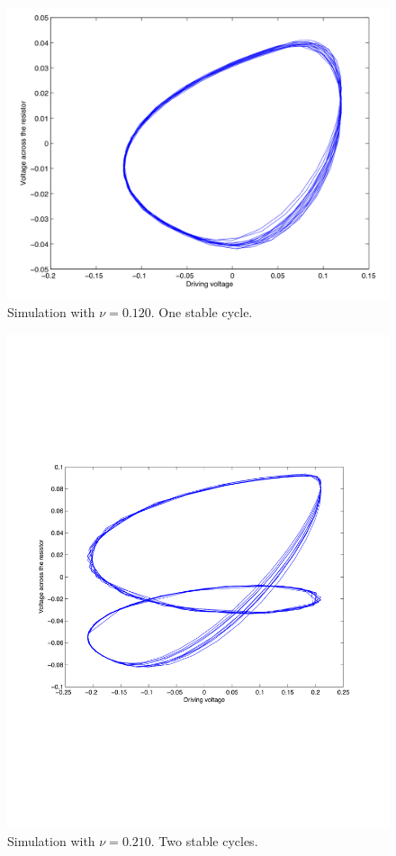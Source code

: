 \documentclass[12pt]{report}
\begin{document}
	\begin{figure}
		\centering
		\includegraphics{simulations/plotnu0120.png}
		\caption{Simulation with $\nu=0.120$. One stable cycle.}
		\label{fig:sim.0120}
	\end{figure}
	
	\begin{figure}
		\centering
		\includegraphics{simulations/plot0210.pdf}
		\caption{Simulation with $\nu=0.210$. Two stable cycles.}
		\label{fig:sim.0210}
	\end{figure}
\end{document}
